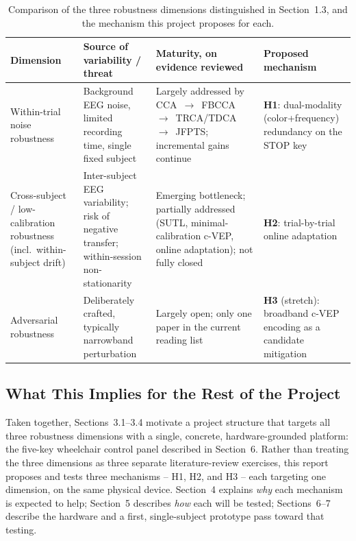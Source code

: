 \documentclass[11pt]{article}
\begin{document}
\begin{table}[htbp]
\centering
\caption{Comparison of the three robustness dimensions distinguished in Section~1.3, and the mechanism this project proposes for each.}
\label{tab:robustness}
\small
\begin{tabular}{@{}p{2.4cm} p{3.6cm} p{2.9cm} p{2.6cm}@{}}
\toprule
\textbf{Dimension} & \textbf{Source of variability / threat} & \textbf{Maturity, on evidence reviewed} & \textbf{Proposed mechanism} \\
\midrule
Within-trial noise robustness &
Background EEG noise, limited recording time, single fixed subject &
Largely addressed by CCA~$\rightarrow$~FBCCA~$\rightarrow$~TRCA/TDCA~$\rightarrow$~JFPTS; incremental gains continue &
\textbf{H1}: dual-modality (color+frequency) redundancy on the STOP key \\
\addlinespace
Cross-subject / low-calibration robustness (incl.\ within-subject drift) &
Inter-subject EEG variability; risk of negative transfer; within-session non-stationarity &
Emerging bottleneck; partially addressed (SUTL, minimal-calibration c-VEP, online adaptation); not fully closed &
\textbf{H2}: trial-by-trial online adaptation \\
\addlinespace
Adversarial robustness &
Deliberately crafted, typically narrowband perturbation &
Largely open; only one paper in the current reading list &
\textbf{H3} (stretch): broadband c-VEP encoding as a candidate mitigation \\
\bottomrule
\end{tabular}
\end{table}

\subsection{What This Implies for the Rest of the Project}

Taken together, Sections~3.1--3.4 motivate a project structure that targets all three robustness dimensions with a single, concrete, hardware-grounded platform: the five-key wheelchair control panel described in Section~6. Rather than treating the three dimensions as three separate literature-review exercises, this report proposes and tests three mechanisms -- H1, H2, and H3 -- each targeting one dimension, on the same physical device. Section~4 explains \emph{why} each mechanism is expected to help; Section~5 describes \emph{how} each will be tested; Sections~6--7 describe the hardware and a first, single-subject prototype pass toward that testing.
\end{document}
